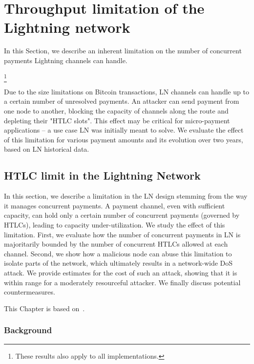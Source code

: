 \chapter{Throughput limitation of the Lightning network}

\label{Chapter08HTLClimit}

In this Section, we describe an inherent limitation on the number of concurrent payments Lightning channels can handle.

\footnote{These results also apply to all implementations.}

Due to the size limitations on Bitcoin transactions, LN channels can handle up to a certain number of unresolved payments.
An attacker can send payment from one node to another, blocking the capacity of channels along the route and depleting their "HTLC slots".
This effect may be critical for micro-payment applications -- a use case LN was initially meant to solve.
We evaluate the effect of this limitation for various payment amounts and its evolution over two years, based on LN historical data.

\section{HTLC limit in the Lightning Network}
\label{sec:attack}

In this section, we describe a limitation in the LN design 
stemming from the way it manages concurrent payments. 
A payment channel, even with sufficient capacity, can hold only 
a certain number of concurrent payments (governed by HTLCs), leading to capacity under-utilization. 
We study the effect of this limitation.
First, we evaluate how the number of concurrent payments in LN 
is majoritarily bounded by the number of concurrent HTLCs allowed at each channel. 
Second, we show how a malicious node can abuse this 
limitation to isolate parts of the network, 
which ultimately results in a network-wide DoS attack.
We provide estimates for the cost of such an attack, showing that it is within range for a moderately resourceful attacker. 
We finally discuss potential countermeasures.

This Chapter is based on~\cite{Tikhomirov2020a}.

\subsection{Background} \label{max-htlc-background}


